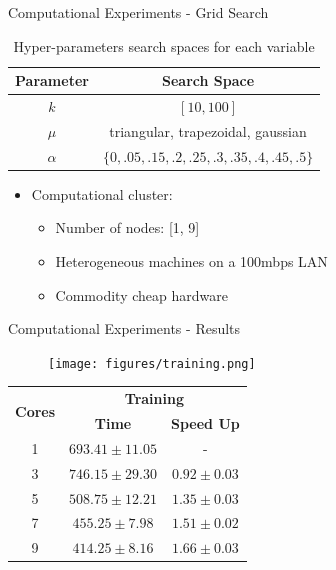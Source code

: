 \documentclass{beamer}
\begin{document}
\begin{frame}{Computational Experiments - Grid Search}

\begin{table}
    \centering
    \begin{tabular}{|c|c|} \hline
        \textbf{Parameter} & \textbf{Search Space} \\ \hline
         $k$ & $[10,100]$ \\ \hline
         $\mu$ & triangular, trapezoidal, gaussian  \\ \hline
         $\alpha$ & $\{0, .05, .15, .2, .25, .3,  .35, .4, .45, .5\}$  \\ \hline
    \end{tabular}
    \caption{Hyper-parameters search spaces for each variable}
    \label{tab:hyperparam_const}
\end{table}

\begin{itemize}
    \item Computational cluster:
    \begin{itemize}
        \item Number of nodes: [1, 9]
        \item Heterogeneous machines on a 100mbps LAN
        \item Commodity cheap hardware
    \end{itemize}
\end{itemize}

\end{frame}

\begin{frame}{Computational Experiments - Results}

\begin{figure}
    \texttt{[image: figures/training.png]}
\end{figure}

\begin{table}[]
    \centering
    \begin{tabular}{|c|c|c|}
\hline
\multirow{2}{*}{\textbf{Cores}} & \multicolumn{2}{c|}{\textbf{Training}} \\ \cline{2-3} 
& \textbf{Time}    & \textbf{Speed Up}    \\ \hline
1 & $693.41 \pm 11.05$ & -     \\ \hline
3 & $746.15 \pm 29.30$ & $0.92 \pm	0.03$ \\ \hline
5 & $508.75 \pm 12.21$ & $1.35 \pm	0.03$ \\ \hline
7 & $455.25 \pm	7.98$ & $1.51 \pm 0.02$  \\ \hline
9 & $414.25 \pm	8.16$ & $1.66 \pm 0.03$ \\ \hline
\end{tabular}
\end{table}

\end{frame}
\end{document}
